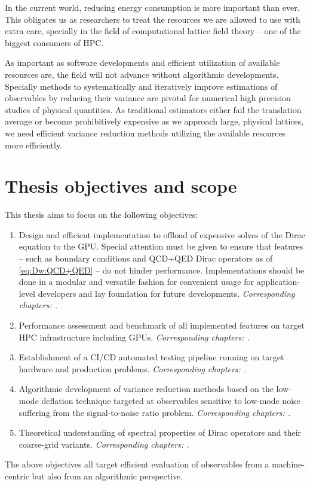 In the current world, reducing energy consumption is more important than ever.
This obligates us as researchers to treat the resources we are allowed to use with extra care, specially in the field of computational lattice field theory -- one of the biggest consumers of HPC.

As important as software developments and efficient utilization of available resources are, the field will not advance without algorithmic developments.
Specially methods to systematically and iteratively improve estimations of observables by reducing their variance are pivotal for numerical high precision studies of physical quantities.
As traditional estimators either fail the translation average or become prohibitively expensive as we approach large, physical lattices, we need efficient variance reduction methods utilizing the available resources more efficiently.





\section{Thesis objectives and scope}
\label{sec:intro:objectives}

This thesis aims to focus on the following objectives:
\begin{enumerate}
\item{
Design and efficient implementation to offload of expensive solves of the Dirac equation to the GPU.
Special attention must be given to ensure that features -- such as \Cstar boundary conditions and QCD+QED Dirac operators as of \cref{eq:Dw:QCD+QED} -- do not hinder performance.
Implementations should be done in a modular and versatile fashion for convenient usage for application-level developers and lay foundation for future developments.
\emph{Corresponding chapters: .}
}
\item{
Performance assessment and benchmark of all implemented features on target HPC infrastructure including GPUs.
\emph{Corresponding chapters: .}
}
\item{
Establishment of a CI/CD automated testing pipeline running on target hardware and production problems.
\emph{Corresponding chapters: .}
}
\item{
Algorithmic development of variance reduction methods based on the low-mode deflation technique targeted at observables sensitive to low-mode noise suffering from the signal-to-noise ratio problem.
\emph{Corresponding chapters: .}
}
\item{
Theoretical understanding of spectral properties of Dirac operators and their coarse-grid variants.
\emph{Corresponding chapters: .}
}
\end{enumerate}
The above objectives all target efficient evaluation of observables from a machine-centric but also from an algorithmic perspective.

